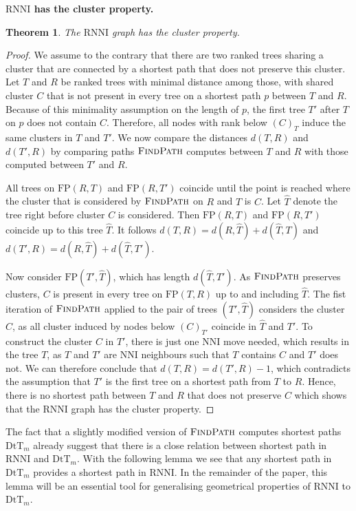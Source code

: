 \documentclass[11pt]{amsart}
\newtheorem{theorem}{Theorem}
\newcommand{\rnni}{\mathrm{RNNI}}
\newcommand{\findpath}{\textsc{FindPath}}
\newcommand{\nni}{\mathrm{NNI}}
\newcommand{\fp}{\mathrm{FP}}
\newcommand{\dtt}{\mathrm{DtT}}
\newcommand{\summary}[1]{\textbf{#1}} %
\begin{document}
\summary{$\rnni$ has the cluster property.}
\begin{theorem}
	The $\rnni$ graph has the cluster property.
	\label{thm:cluster_property_rnni}
\end{theorem}

\begin{proof}
	We assume to the contrary that there are two ranked trees sharing a cluster that are connected by a shortest path that does not preserve this cluster.
	Let $T$ and $R$ be ranked trees with minimal distance among those, with shared cluster $C$ that is not present in every tree on a shortest path $p$ between $T$ and $R$.
	Because of this minimality assumption on the length of $p$, the first tree $T'$ after $T$ on $p$ does not contain $C$.
	Therefore, all nodes with rank below $(C)_T$ induce the same clusters in $T$ and $T'$.
	We now compare the distances $d(T,R)$ and $d(T',R)$ by comparing paths $\findpath$ computes between $T$ and $R$ with those computed between $T'$ and $R$.

	All trees on $\fp(R,T)$ and $\fp(R, T')$ coincide until the point is reached where the cluster that is considered by $\findpath$ on $R$ and $T$ is $C$.
	Let $\hat T$ denote the tree right before cluster $C$ is considered.
	Then $\fp(R,T)$ and $\fp(R,T')$ coincide up to this tree $\hat T$.
	It follows $d(T,R) = d(R,\hat T) + d(\hat T, T)$ and $d(T',R) = d(R,\hat T) + d(\hat T, T')$.

	Now consider $\fp(T', \hat T)$, which has length $d(\hat T, T')$.
	As $\findpath$ preserves clusters, $C$ is present in every tree on $\fp(T,R)$ up to and including $\hat T$.
	The fist iteration of $\findpath$ applied to the pair of trees $(T',\hat T)$ considers the cluster $C$, as all cluster induced by nodes below $(C)_{T'}$ coincide in $\hat T$ and $T'$.
	To construct the cluster $C$ in $T'$, there is just one $\nni$ move needed, which results in the tree $T$, as $T$ and $T'$ are $\nni$ neighbours such that $T$ contains $C$ and $T'$ does not.
	We can therefore conclude that $d(T,R) = d(T',R) - 1$, which contradicts the assumption that $T'$ is the first tree on a shortest path from $T$ to $R$.
	Hence, there is no shortest path between $T$ and $R$ that does not preserve $C$ which shows that the $\rnni$ graph has the cluster property.
\end{proof}

The fact that a slightly modified version of $\findpath$ computes shortest paths $\dtt_m$ already suggest that there is a close relation between shortest path in $\rnni$ and $\dtt_m$.
With the following lemma we see that any shortest path in $\dtt_m$ provides a shortest path in $\rnni$.
In the remainder of the paper, this lemma will be an essential tool for generalising geometrical properties of $\rnni$ to $\dtt_m$.
\end{document}
